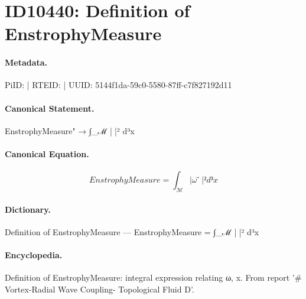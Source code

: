 \section*{ID10440: Definition of EnstrophyMeasure}
\paragraph{Metadata.}
PiID:  | RTEID:  | UUID: 5144f1da-59c0-5580-87ff-c7f827192d11

\paragraph{Canonical Statement.}
EnstrophyMeasure" → ∫\_ℳ |ω⃗|² d³x

\paragraph{Canonical Equation.}
\[
EnstrophyMeasure = ∫_ℳ |ω⃗|² d³x
\]

\paragraph{Dictionary.}
Definition of EnstrophyMeasure — EnstrophyMeasure = ∫\_ℳ |ω⃗|² d³x

\paragraph{Encyclopedia.}
Definition of EnstrophyMeasure: integral expression relating ω, x. From report '\# Vortex-Radial Wave Coupling- Topological Fluid D'.
